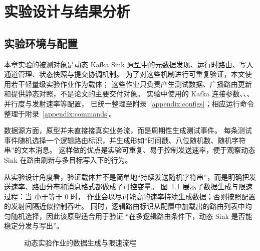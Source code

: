 
\chapter{实验设计与结果分析}

\section{实验环境与配置}

本章实验的被测对象是动态 Kafka Sink 原型中的元数据发现、运行时路由、写入通道管理、状态快照与提交协调机制。
为了对这些机制进行可重复验证，本文使用若干轻量级实验作业作为载体；
这些作业只负责产生测试数据、广播路由更新和提供静态对照，不是论文的主要交付对象。
实验中使用的 Kafka 连接参数、、、并行度与发射速率等配置，
已统一整理至附录~\ref{appendix:configs}；相应运行命令整理于附录~\ref{appendix:commands}。

数据源方面，原型并未直接接真实业务流，而是周期性生成测试事件。
每条测试事件随机选择一个逻辑路由标识，并生成形如“时间戳、八位随机数、随机字符串”的文本消息。
这样做的优点是实验可重复、易于控制发送速率，便于观察动态 Sink 在路由刷新与多目标写入下的行为。

从实验设计角度看，验证载体并不是简单地“持续发送随机字符串”，而是明确把发送速率、路由分布和消息格式都做成了可控变量。
图~\ref{fig:datagen-rate-flow} 展示了数据生成与限速过程：当  小于等于 0 时，
作业会以尽可能高的速率持续生成数据；否则按照配置的发射间隔近似控制吞吐。
同时，逻辑路由标识从配置中加载出的路由列表中均匀随机选择，因此该原型适合用于验证
“在多逻辑路由条件下，动态 Sink 是否能稳定分发与写出”。

\begin{figure}[htbp]
  \centering
  \caption{动态实验作业的数据生成与限速流程}
  \label{fig:datagen-rate-flow}
\end{figure}

